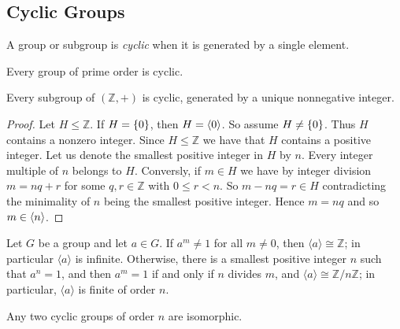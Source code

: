 \subsection{Cyclic Groups}

\begin{definition}
	A group or subgroup is \emph{cyclic} when it is generated by a single element.
\end{definition}

\vspace{2mm}

\begin{lemma}
	Every group of prime order is cyclic.
\end{lemma}

\vspace{2mm}

\begin{proposition}
	Every subgroup of $(\mathbb{Z},+)$ is cyclic, generated by a unique nonnegative integer.
\end{proposition}

\begin{proof}
	Let $H \leq \mathbb{Z}$. If $H = \cbr[0]{0}$, then $H = \left\langle {0} \right\rangle$. So assume $H \neq \cbr[0]{0}$. Thus $H$ contains a nonzero integer. Since $H \leq \mathbb{Z}$ we have that $H$ contains a positive integer. Let us denote the smallest positive integer in $H$ by $n$. Every integer multiple of $n$ belongs to $H$. Conversly, if $m \in H$ we have by integer division $m = nq + r$ for some $q,r \in \mathbb{Z}$ with $0 \leq r < n$. So $m - nq = r \in H$ contradicting the minimality of $n$ being the smallest positive integer. Hence $m = nq$ and so $m \in \left\langle {n} \right\rangle$.
\end{proof}

\vspace{2mm}

\begin{proposition}
	Let $G$ be a group and let $a \in G$. If $a^m \neq 1$ for all $m \neq 0$, then $\langle a \rangle \cong \mathbb{Z}$; in particular $\langle a \rangle$ is infinite. Otherwise, there is a smallest positive integer $n$ such that $a^n = 1$, and then $a^m = 1$ if and only if $n$ divides $m$, and $\langle a \rangle \cong \mathbb{Z}/n\mathbb{Z}$; in particular, $\langle a \rangle$ is finite of order $n$.
\end{proposition}

\vspace{2mm}

\begin{corollary}
	Any two cyclic groups of order $n$ are isomorphic.
\end{corollary}

